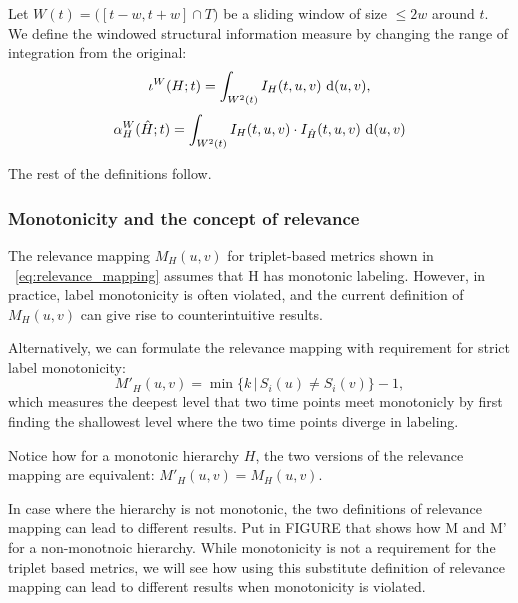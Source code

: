 Let $W(t) = \big( [t - w, t + w] \cap T\big)$ be a sliding window of size $\leq 2w$ around $t$.
We define the windowed structural information measure by changing the range of integration from the original:
\[
    \iota^W(H;t) = \int_{W^2(t)} I_H(t,u,v)\,\mathop{}\!\mathrm{d}(u,v), 
    \label{eq:windowed_richness}
\]
\[ \displaystyle
    \alpha^W_H(\hat{H};t) = \int_{W^2(t)} I_H(t,u,v)\cdot I_{\hat{H}}(t,u,v)\,\mathop{}\!\mathrm{d}(u,v) 
    \label{eq:windowed_agreement}
\]


The rest of the definitions follow.

\subsubsection{Monotonicity and the concept of relevance}
The relevance mapping \(M_H(u,v)\) for triplet-based metrics shown in ~\eqref{eq:relevance_mapping} assumes that H has monotonic labeling.
However, in practice, label monotonicity is often violated, and the current definition of \(M_H(u,v)\) can give rise to counterintuitive results.

Alternatively, we can formulate the relevance mapping with requirement for strict label monotonicity:
\begin{equation}
    M'_H(u,v) = \min \bigl\{k \, |\, S_i(u) \neq S_i(v)\bigr\} - 1,
    \label{eq:monotonic_meet}
\end{equation}
which measures the deepest level that two time points meet monotonicly by first finding the shallowest level where the two time points diverge in labeling.

Notice how for a monotonic hierarchy $H$, the two versions of the relevance mapping are equivalent: $M'_H(u,v) = M_H(u,v)$.  

In case where the hierarchy is not monotonic, the two definitions of relevance mapping can lead to different results.
Put in FIGURE that shows how M and M' for a non-monotnoic hierarchy.
While monotonicity is not a requirement for the triplet based metrics, we will see how using this substitute definition of relevance mapping can lead to different results when monotonicity is violated.
